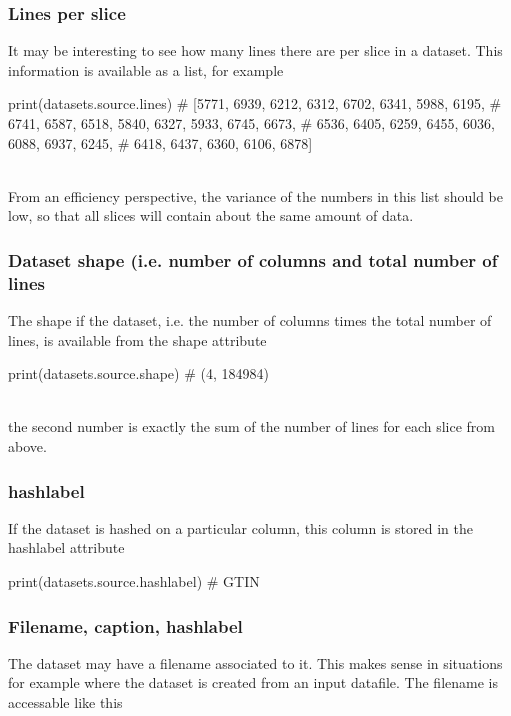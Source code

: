 \subsubsection{Lines per slice}

It may be interesting to see how many lines there are per slice in a
dataset.  This information is available as a list, for example

\begin{python}
print(datasets.source.lines)
# [5771, 6939, 6212, 6312, 6702, 6341, 5988, 6195,
#  6741, 6587, 6518, 5840, 6327, 5933, 6745, 6673,
#  6536, 6405, 6259, 6455, 6036, 6088, 6937, 6245,
#  6418, 6437, 6360, 6106, 6878]
\end{python}
\\
From an efficiency perspective, the variance of the numbers in this
list should be low, so that all slices will contain about the same
amount of data.

\subsubsection{Dataset shape (i.e. number of columns and total number
  of lines}

The shape if the dataset, i.e. the number of columns times the total
number of lines, is available from the shape attribute

\begin{python}
print(datasets.source.shape)
# (4, 184984)
\end{python}
\\
the second number is exactly the sum of the number of lines for each
slice from above.



\subsubsection{hashlabel}
If the dataset is hashed on a particular column, this column is stored
in the hashlabel attribute

\begin{python}
print(datasets.source.hashlabel)
# GTIN
\end{python}



\subsubsection{Filename, caption, hashlabel}

The dataset may have a filename associated to it.  This makes sense in
situations for example where the dataset is created from an input
datafile.  The filename is accessable like this


